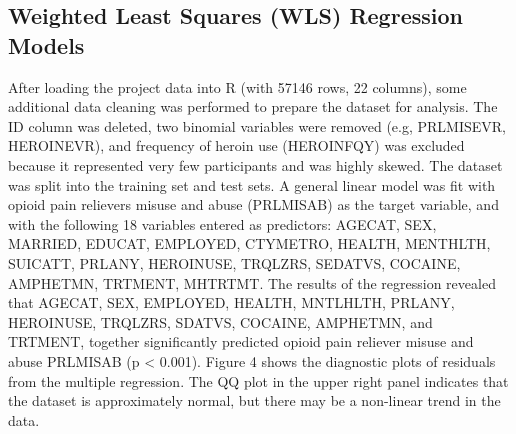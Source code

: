\documentclass[sigconf]{acmart}
\begin{document}




\subsection{Weighted Least Squares (WLS) Regression Models}

After loading the project data into R (with 57146 rows, 
22 columns), some additional data cleaning was performed to prepare the 
dataset for analysis. The ID column was deleted, two binomial variables were 
removed (e.g, PRLMISEVR, HEROINEVR), and frequency of heroin use (HEROINFQY) 
was excluded because it represented very few participants and was highly skewed. 
The dataset was split into the training set and test sets. A general linear 
model was fit with opioid pain relievers misuse and abuse (PRLMISAB) as the 
target variable, and with the following 18 variables entered as predictors: 
AGECAT, SEX, MARRIED, EDUCAT, EMPLOYED, CTYMETRO, HEALTH, MENTHLTH, SUICATT,
PRLANY, HEROINUSE, TRQLZRS, SEDATVS, COCAINE, AMPHETMN, TRTMENT, MHTRTMT. 
The results of the regression revealed that AGECAT, SEX, EMPLOYED, HEALTH, 
MNTLHLTH, PRLANY, HEROINUSE, TRQLZRS, SDATVS, COCAINE, AMPHETMN, and TRTMENT, 
together significantly predicted opioid pain reliever misuse and abuse 
PRLMISAB (p < 0.001). Figure 4 shows the diagnostic plots of residuals from 
the multiple regression. The QQ plot in the upper right panel indicates that 
the dataset is approximately normal, but there may be a non-linear trend 
in the data. 


\end{document}
